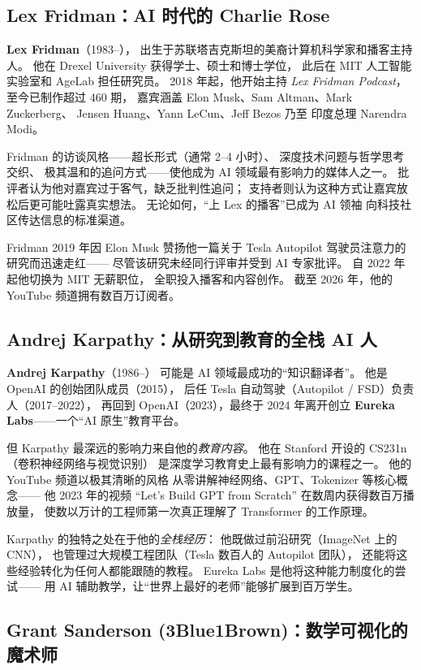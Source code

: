 \subsection{Lex Fridman：AI 时代的 Charlie Rose}

\textbf{Lex Fridman}（1983--），
出生于苏联塔吉克斯坦的美裔计算机科学家和播客主持人。
他在 Drexel University 获得学士、硕士和博士学位，
此后在 MIT 人工智能实验室和 AgeLab 担任研究员。
2018 年起，他开始主持 \emph{Lex Fridman Podcast}，
至今已制作超过 460 期，
嘉宾涵盖 Elon Musk、Sam Altman、Mark Zuckerberg、
Jensen Huang、Yann LeCun、Jeff Bezos 乃至
印度总理 Narendra Modi。

Fridman 的访谈风格——超长形式（通常 2--4 小时）、
深度技术问题与哲学思考交织、
极其温和的追问方式——使他成为 AI 领域最有影响力的媒体人之一。
批评者认为他对嘉宾过于客气，缺乏批判性追问；
支持者则认为这种方式让嘉宾放松后更可能吐露真实想法。
无论如何，``上 Lex 的播客''已成为 AI 领袖
向科技社区传达信息的标准渠道。

Fridman 2019 年因 Elon Musk 赞扬他一篇关于 Tesla Autopilot
驾驶员注意力的研究而迅速走红——
尽管该研究未经同行评审并受到 AI 专家批评。
自 2022 年起他切换为 MIT 无薪职位，
全职投入播客和内容创作。
截至 2026 年，他的 YouTube 频道拥有数百万订阅者。

\subsection{Andrej Karpathy：从研究到教育的全栈 AI 人}

\textbf{Andrej Karpathy}（1986--）
可能是 AI 领域最成功的``知识翻译者''。
他是 OpenAI 的创始团队成员（2015），
后任 Tesla 自动驾驶（Autopilot / FSD）负责人（2017--2022），
再回到 OpenAI（2023），最终于 2024 年离开创立
\textbf{Eureka Labs}——一个``AI 原生''教育平台。

但 Karpathy 最深远的影响力来自他的\emph{教育内容}。
他在 Stanford 开设的 CS231n（卷积神经网络与视觉识别）
是深度学习教育史上最有影响力的课程之一。
他的 YouTube 频道以极其清晰的风格
从零讲解神经网络、GPT、Tokenizer 等核心概念——
他 2023 年的视频 ``Let's Build GPT from Scratch''
在数周内获得数百万播放量，
使数以万计的工程师第一次真正理解了 Transformer 的工作原理。

Karpathy 的独特之处在于他的\emph{全栈经历}：
他既做过前沿研究（ImageNet 上的 CNN），
也管理过大规模工程团队（Tesla 数百人的 Autopilot 团队），
还能将这些经验转化为任何人都能跟随的教程。
Eureka Labs 是他将这种能力制度化的尝试——
用 AI 辅助教学，让``世界上最好的老师''能够扩展到百万学生。

\subsection{Grant Sanderson (3Blue1Brown)：数学可视化的魔术师}

